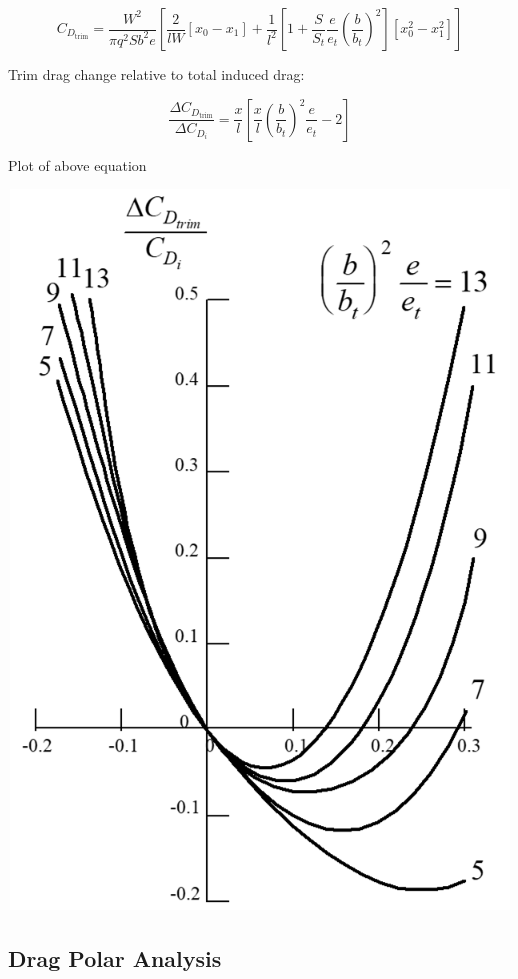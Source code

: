 \documentclass[
]{book}
\begin{document}
\[C_{D_{\mathrm{trim}}} = \frac{W^2}{\pi q^2 Sb^2e} \left[\frac{2}{lW}\left[x_0 - x_1\right] + \frac{1}{l^2} \left[1 + \frac{S}{S_t} \frac{e}{e_t} \left(\frac{b}{b_t}\right)^2\right] \left[x_0^2 - x_1^2\right] \right]\]

Trim drag change relative to total induced drag:

\[\frac{\Delta C_{D_{\mathrm{trim}}}}{\Delta C_{D_i}} = \frac{x}{l} \left[\frac{x}{l} \left(\frac{b}{b_t}\right)^2 \frac{e}{e_t} - 2 \right] \]

Plot of above equation

\includegraphics[width=6.5in,height=7.507in]{media/05/image89.png}

\hypertarget{drag-polar-analysis}{%
\subsection{Drag Polar Analysis}\label{drag-polar-analysis}}
\end{document}
